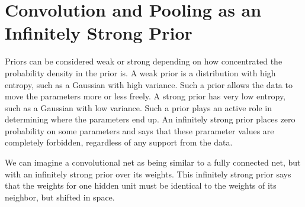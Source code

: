 \documentclass[onecolumn, letterpaper, 12pt]{report}
\begin{document}
\section{Convolution and Pooling as an Infinitely Strong Prior}

Priors can be considered weak or strong depending on how concentrated the probability density in the prior is. A weak prior is a distribution with high entropy, such as a Gaussian with high variance. Such a prior allows the data to move the parameters more or less freely. A strong prior has very low entropy, such as a Gaussian with low variance. Such a prior plays an active role in determining where the parameters end up. An infinitely strong prior places zero probability on some parameters and says that these prarameter values are completely forbidden, regardless of any support from the data. 

We can imagine a convolutional net as being similar to a fully connected net, but with an infinitely strong prior over its weights. This infinitely strong prior says that the weights for one hidden unit must be identical to the weights of its neighbor, but shifted in space. 
\end{document}
